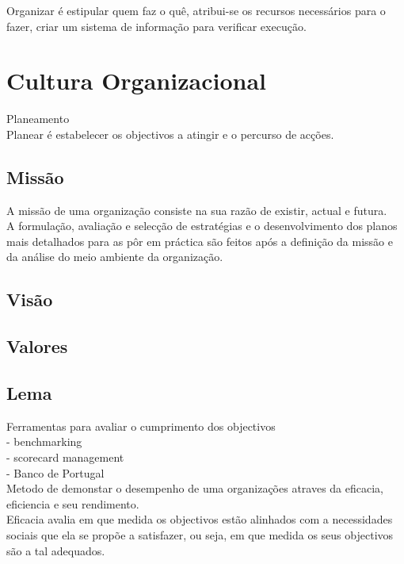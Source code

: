Organizar é estipular quem faz o quê, atribui-se os recursos necessários para o fazer, criar um sistema de informação para verificar execução.\\



\section{Cultura Organizacional}
Planeamento\\

Planear é estabelecer os objectivos a atingir e o percurso de acções.\\

\subsection{Missão}
A missão de uma organização consiste na sua razão de existir, actual e futura.\\
A formulação, avaliação e selecção de estratégias e o desenvolvimento dos planos mais detalhados para as pôr em práctica são feitos após a definição da missão e da análise do meio ambiente da organização.\\



\subsection{Visão}



\subsection{Valores}



\subsection{Lema}


Ferramentas para avaliar o cumprimento dos objectivos\\
- benchmarking\\
- scorecard management\\
- Banco de Portugal\\

Metodo de demonstar o desempenho de uma organizações atraves da eficacia, eficiencia e seu rendimento.\\

Eficacia avalia em que medida os objectivos estão alinhados com a necessidades sociais que ela se propõe a satisfazer, ou seja, em que medida os seus objectivos são a tal adequados.\\


